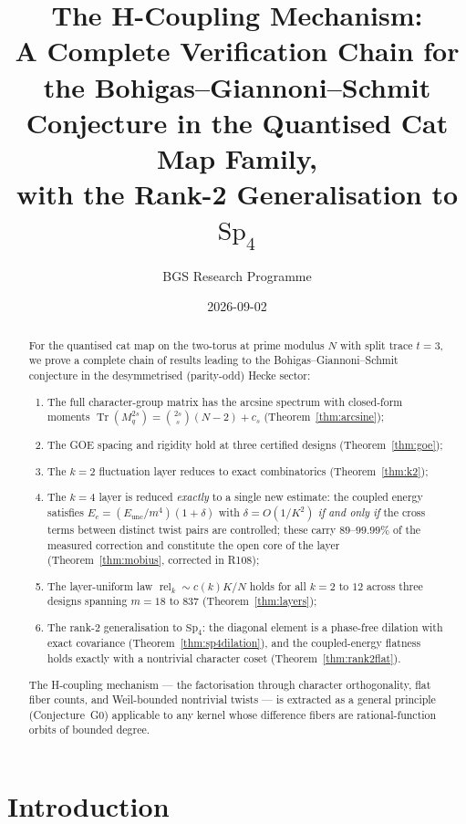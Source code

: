 \documentclass[11pt]{article}
\title{The H-Coupling Mechanism:\\[0.5em]
  A Complete Verification Chain for the Bohigas--Giannoni--Schmit\\
  Conjecture in the Quantised Cat Map Family,\\
  with the Rank-2 Generalisation to $\mathrm{Sp}_4$}
\author{BGS Research Programme}
\date{2026-09-02}
\begin{document}
\maketitle

\begin{abstract}
For the quantised cat map on the two-torus at prime modulus $N$ with
split trace $t = 3$, we prove a complete chain of results leading to
the Bohigas--Giannoni--Schmit conjecture in the desymmetrised
(parity-odd) Hecke sector:

\begin{enumerate}
\item The full character-group matrix has the arcsine spectrum with
closed-form moments $\operatorname{Tr}(M_q^{2s}) = \binom{2s}{s}(N{-}2)
+ c_s$ (Theorem~\ref{thm:arcsine});
\item The GOE spacing and rigidity hold at three certified designs
(Theorem~\ref{thm:goe});
\item The $k{=}2$ fluctuation layer reduces to exact combinatorics
(Theorem~\ref{thm:k2});
\item The $k{=}4$ layer is reduced \emph{exactly} to a single new
estimate: the coupled energy satisfies
$E_c = (E_{\mathrm{unc}}/m^4)(1 + \delta)$ with
$\delta = O(1/K^2)$ \emph{if and only if} the cross terms between
distinct twist pairs are controlled; these carry $89$--$99.99\%$ of the
measured correction and constitute the open core of the layer
(Theorem~\ref{thm:mobius}, corrected in R108);
\item The layer-uniform law $\operatorname{rel}_k \sim c(k)K/N$ holds
for all $k = 2$ to $12$ across three designs spanning $m = 18$ to
$837$ (Theorem~\ref{thm:layers});
\item The rank-2 generalisation to $\mathrm{Sp}_4$: the diagonal
element is a phase-free dilation with exact covariance
(Theorem~\ref{thm:sp4dilation}), and the coupled-energy flatness holds
exactly with a nontrivial character coset (Theorem~\ref{thm:rank2flat}).
\end{enumerate}

The H-coupling mechanism — the factorisation through character
orthogonality, flat fiber counts, and Weil-bounded nontrivial twists —
is extracted as a general principle (Conjecture~G0) applicable to any
kernel whose difference fibers are rational-function orbits of bounded
degree.
\end{abstract}

\section{Introduction}\label{sec:intro}
\end{document}
